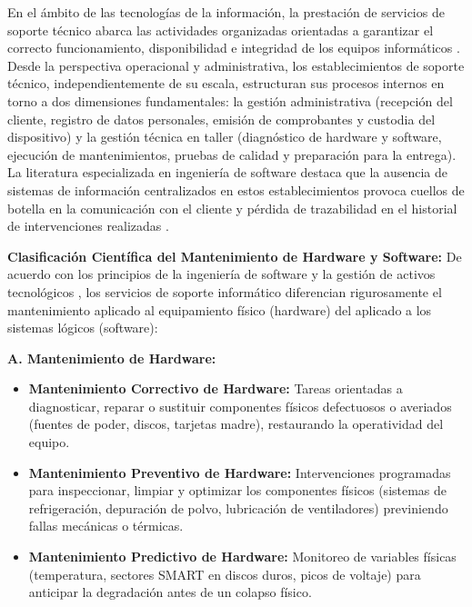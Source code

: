 En el ámbito de las tecnologías de la información, la prestación de servicios de soporte técnico abarca las actividades organizadas orientadas a garantizar el correcto funcionamiento, disponibilidad e integridad de los equipos informáticos \cite{laudon2020}. Desde la perspectiva operacional y administrativa, los establecimientos de soporte técnico, independientemente de su escala, estructuran sus procesos internos en torno a dos dimensiones fundamentales: la gestión administrativa (recepción del cliente, registro de datos personales, emisión de comprobantes y custodia del dispositivo) y la gestión técnica en taller (diagnóstico de hardware y software, ejecución de mantenimientos, pruebas de calidad y preparación para la entrega). La literatura especializada en ingeniería de software destaca que la ausencia de sistemas de información centralizados en estos establecimientos provoca cuellos de botella en la comunicación con el cliente y pérdida de trazabilidad en el historial de intervenciones realizadas \cite{pressman2021}.

\textbf{Clasificación Científica del Mantenimiento de Hardware y Software:} De acuerdo con los principios de la ingeniería de software y la gestión de activos tecnológicos \cite{swanson1980, pressman2021, sommerville2019, iso14764}, los servicios de soporte informático diferencian rigurosamente el mantenimiento aplicado al equipamiento físico (hardware) del aplicado a los sistemas lógicos (software):

\textbf{A. Mantenimiento de Hardware:}
\begin{itemize}
    \item \textbf{Mantenimiento Correctivo de Hardware:} Tareas orientadas a diagnosticar, reparar o sustituir componentes físicos defectuosos o averiados (fuentes de poder, discos, tarjetas madre), restaurando la operatividad del equipo.
    \item \textbf{Mantenimiento Preventivo de Hardware:} Intervenciones programadas para inspeccionar, limpiar y optimizar los componentes físicos (sistemas de refrigeración, depuración de polvo, lubricación de ventiladores) previniendo fallas mecánicas o térmicas.
    \item \textbf{Mantenimiento Predictivo de Hardware:} Monitoreo de variables físicas (temperatura, sectores SMART en discos duros, picos de voltaje) para anticipar la degradación antes de un colapso físico.
\end{itemize}

